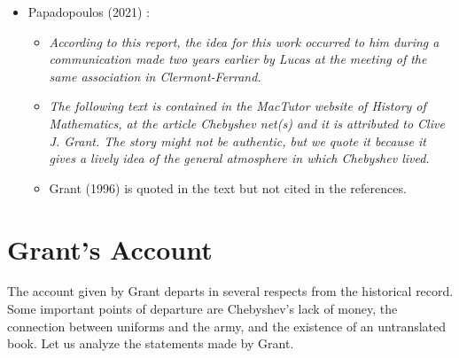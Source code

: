 \documentclass[12pt]{article}
\begin{document}
\begin{itemize}
\begin{itemize}
\item[$\bullet$]Cited are Fuchs and Tabachnikov (2007) \cite{Fuchs2007}, Ghys (2011) \cite{Ghys2011}.

\end{itemize}

\item[]Papadopoulos (2021) \cite{Papadopoulos2021}:

\begin{itemize}

\item[]{\it According to this report, the idea for this work occurred to him during a communication made two years earlier by Lucas at the meeting of the same association in Clermont-Ferrand.}

\item[]{\it The following text is contained in the MacTutor website of History of Mathematics, at the article Chebyshev net(s) and it is attributed to Clive J. Grant. The story might not be authentic, but we quote it because it gives a lively idea of the general atmosphere in which Chebyshev lived.}

\item[$\bullet$]Grant (1996) \cite{Grant1996} is quoted in the text but not cited in the references.

\end{itemize}

\end{itemize}

\section*{Grant's Account}

The account given by Grant departs in several respects from the historical record. Some important points of departure are Chebyshev's lack of money, the connection between uniforms and the army, and the existence of an untranslated book. Let us analyze the statements made by Grant.

\bigskip
\end{document}
